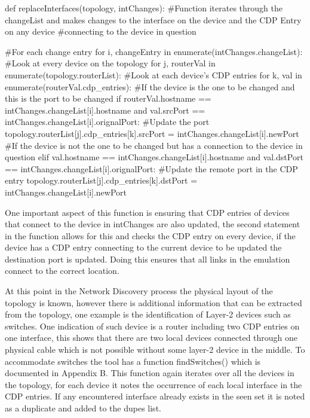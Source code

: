 \documentclass[11pt]{report}
\begin{document}
\begin{python}
def replaceInterfaces(topology, intChanges):
	#Function iterates through the changeList and makes changes to the interface on the device and the CDP Entry on any device
	#connecting to the device in question
	
	#For each change entry
	for i, changeEntry in enumerate(intChanges.changeList):
		#Look at every device on the topology
		for j, routerVal in enumerate(topology.routerList):
			#Look at each device's CDP entries
			for k, val in enumerate(routerVal.cdp_entries):
				#If the device is the one to be changed and this is the port to be changed
				if routerVal.hostname == intChanges.changeList[i].hostname and val.srcPort == intChanges.changeList[i].orignalPort:
					#Update the port
					topology.routerList[j].cdp_entries[k].srcPort = intChanges.changeList[i].newPort
				#If the device is not the one to be changed but has a connection to the device in question
				elif val.hostname == intChanges.changeList[i].hostname and val.dstPort == intChanges.changeList[i].orignalPort:
					#Update the remote port in the CDP entry
					topology.routerList[j].cdp_entries[k].dstPort = intChanges.changeList[i].newPort	
\end{python}

One important aspect of this function is ensuring that CDP entries of devices that connect to the device in intChanges are also updated, the second statement in the function allows for this and checks the CDP entry on every device, if the device has a CDP entry connecting to the current device to be updated the destination port is updated. Doing this ensures that all links in the emulation connect to the correct location.

At this point in the Network Discovery process the physical layout of the topology is known, however there is additional information that can be extracted from the topology, one example is the identification of Layer-2 devices such as switches. One indication of such device is a router including two CDP entries on one interface, this shows that there are two local devices connected through one physical cable which is not possible without some layer-2 device in the middle. To accommodate switches the tool has a function findSwitches() which is documented in Appendix B. This function again iterates over all the devices in the topology, for each device it notes the occurrence of each local interface in the CDP entries. If any encountered interface already exists in the seen set it is noted as a duplicate and added to the dupes list.
\end{document}
